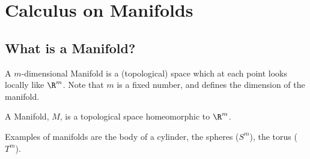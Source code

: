 
\chapter{Calculus on Manifolds}

\section{What is a Manifold?}

A $m$-dimensional {\sc Manifold} is a (topological) space which at each point looks locally like $\R^m$. Note that $m$ is a fixed number, and defines the dimension of the manifold.

\begin{Def}[Manifold]
  A {\sc Manifold}, $M$, is a topological space homeomorphic to $\R^m$.
\end{Def}



Examples of manifolds are  the body of a cylinder,  the spheres ($S^m$), the torus ($T^m$).


